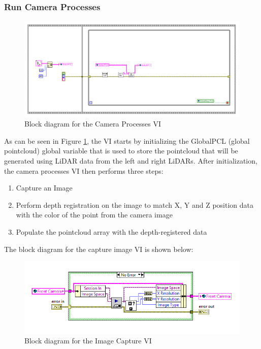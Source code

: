 \subsubsection{Run Camera Processes}

\begin{figure}[h!]
\centering
\includegraphics[scale=0.45]{Photos/allimaging.png}
\caption{Block diagram for the Camera Processes VI}
\label{fig:allimaging}
\end{figure}

\noindent As can be seen in Figure \ref{fig:allimaging}, the VI starts by initializing the GlobalPCL (global pointcloud) global variable that is used to store the pointcloud that will be generated using LiDAR data from the left and right LiDARs. After initialization, the camera processes VI then performs three steps:

\begin{enumerate}
\item Capture an Image
\item Perform depth registration on the image to match X, Y and Z position data with the color of the point from the camera image
\item Populate the pointcloud array with the depth-registered data
\end{enumerate}

\noindent The block diagram for the capture image VI is shown below:

\begin{figure}[h!]
\centering
\includegraphics[scale=0.85]{Photos/imagecap.png}
\caption{Block diagram for the Image Capture VI}
\label{fig:imagecap}
\end{figure}

